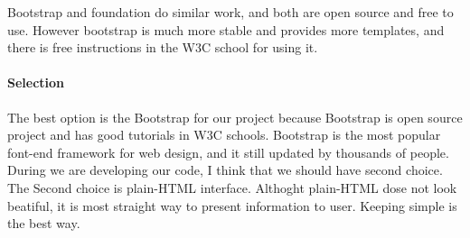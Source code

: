 Bootstrap and foundation do similar work, and both are open source and free to use.
However bootstrap is much more stable and provides more templates, and there is free instructions in the W3C school for using it.

\paragraph{Selection}

The best option is the Bootstrap for our project because Bootstrap is open source project and has good tutorials in W3C schools.
Bootstrap is the most popular font-end framework for web design, and it still updated by thousands of people.
During we are developing our code, I think that we should have second choice.
The Second choice is plain-HTML interface.
Althoght plain-HTML dose not look beatiful, it is most straight way to present information to user.
Keeping simple is the best way.
